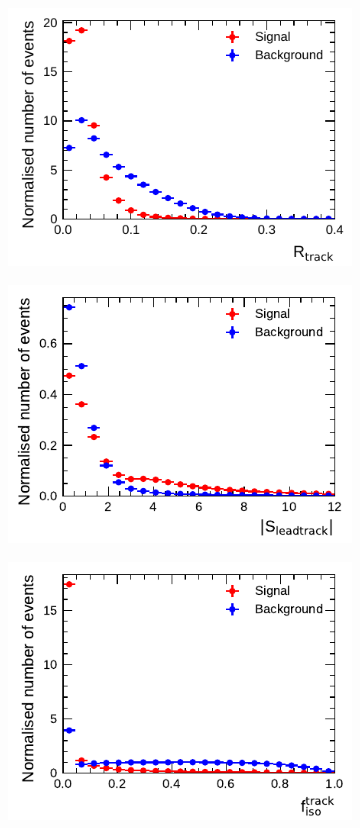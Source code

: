 \begin{figure}[htbp]
\begin{subfigure}{0.5\textwidth}
    \includegraphics{./figures/baseline_bdt_vars/1p/innerTrkAvgDist_fixed.pdf}
  \end{subfigure}%
  \begin{subfigure}{0.5\textwidth}
    \centering
    \includegraphics{./figures/baseline_bdt_vars/1p/absipSigLeadTrk.pdf}
  \end{subfigure}
  \begin{subfigure}{0.5\textwidth}
    \centering
    \includegraphics{./figures/baseline_bdt_vars/1p/SumPtTrkFrac.pdf}

\end{subfigure}
\end{figure}

